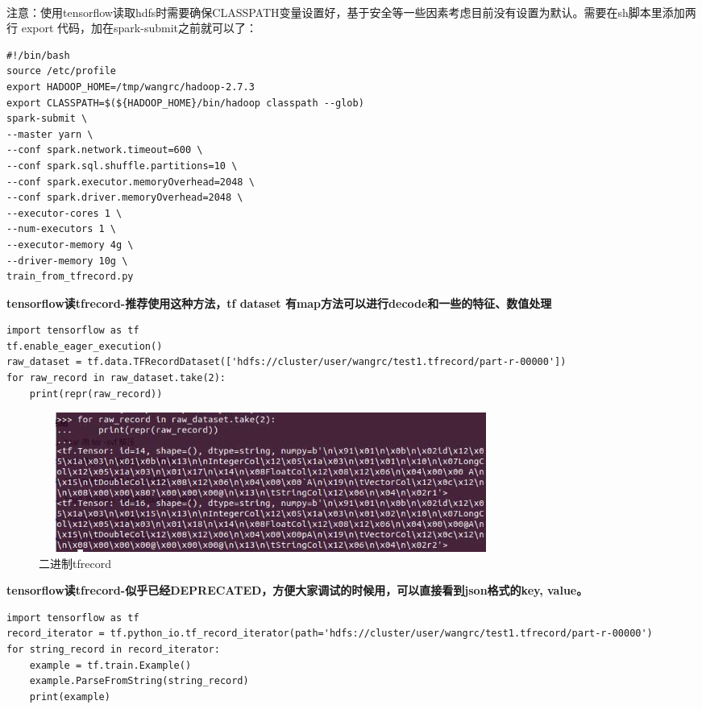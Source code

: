 \documentclass[12pt,a4paper,oneside]{article}
\begin{document}
\begin{CJK*}{UTF8}{gbsn}
~\\
注意：使用tensorflow读取hdfs时需要确保CLASSPATH变量设置好，基于安全等一些因素考虑目前没有设置为默认。需要在sh脚本里添加两行 export 代码，加在spark-submit之前就可以了：
\begin{lstlisting}
#!/bin/bash
source /etc/profile
export HADOOP_HOME=/tmp/wangrc/hadoop-2.7.3
export CLASSPATH=$(${HADOOP_HOME}/bin/hadoop classpath --glob)
spark-submit \
--master yarn \
--conf spark.network.timeout=600 \
--conf spark.sql.shuffle.partitions=10 \
--conf spark.executor.memoryOverhead=2048 \
--conf spark.driver.memoryOverhead=2048 \
--executor-cores 1 \
--num-executors 1 \
--executor-memory 4g \
--driver-memory 10g \
train_from_tfrecord.py
\end{lstlisting}

\textbf{tensorflow读tfrecord-推荐使用这种方法，tf dataset 有map方法可以进行decode和一些的特征、数值处理}

\begin{lstlisting}
import tensorflow as tf
tf.enable_eager_execution()
raw_dataset = tf.data.TFRecordDataset(['hdfs://cluster/user/wangrc/test1.tfrecord/part-r-00000'])
for raw_record in raw_dataset.take(2):
    print(repr(raw_record))
\end{lstlisting}

\begin{figure}[h]
\centering
\includegraphics[width=6in,height=1.8in]{print1}
\caption{ 二进制tfrecord}
\end{figure}

\textbf{tensorflow读tfrecord-似乎已经DEPRECATED，方便大家调试的时候用，可以直接看到json格式的key, value。}

\begin{lstlisting}
import tensorflow as tf
record_iterator = tf.python_io.tf_record_iterator(path='hdfs://cluster/user/wangrc/test1.tfrecord/part-r-00000')
for string_record in record_iterator:
    example = tf.train.Example()
    example.ParseFromString(string_record)
    print(example)
\end{lstlisting}


\end{CJK*}
\end{document}
